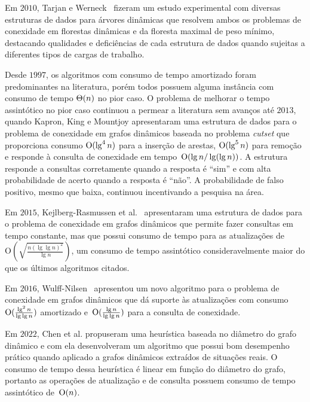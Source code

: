 Em $2010$, Tarjan e Werneck~\cite{tarjanWerneck2010} fizeram um estudo experimental com diversas estruturas de dados para árvores dinâmicas que resolvem ambos os problemas de conexidade em florestas dinâmicas e da floresta maximal de peso mínimo,
destacando qualidades e deficiências de cada estrutura de dados quando sujeitas a diferentes tipos de cargas de trabalho. 

Desde $1997$, os algoritmos com consumo de tempo amortizado foram predominantes na literatura, porém todos possuem alguma instância com consumo de tempo $\Theta(n)$ no pior caso.
O problema de melhorar o tempo assintótico no pior caso continuou a permear a literatura sem avanços até $2013$, quando Kapron, King e Mountjoy \cite{bruceM} apresentaram uma estrutura de dados para o problema de conexidade em grafos dinâmicos baseada no problema \textit{cutset} que proporciona consumo $\mathrm{O}(\lg^4 n)$ para a inserção de arestas, $\mathrm{O}(\lg^5 n)$ para remoção e responde à consulta de conexidade em tempo~$\mathrm{O}(\lg n / \lg(\lg n))$.
A estrutura responde a consultas corretamente quando a resposta é “sim” e com alta probabilidade de acerto quando a resposta é “não”. A probabilidade de falso positivo, mesmo que baixa, continuou incentivando a pesquisa na área. 

Em $2015$, Kejlberg-Rasmussen et al.~\cite{kejlbergrasmussen_et_al} apresentaram uma estrutura de dados para o problema de conexidade em grafos dinâmicos que permite fazer consultas em tempo constante, mas que possui consumo de tempo para as atualizações de~$\mathrm{O}\!\left(\sqrt{\frac{n\left(\lg \lg n\right)^2}{\lg n}}\right)$, um consumo de tempo assintótico consideravelmente maior do que os últimos algoritmos citados.

Em $2016$, Wulff-Nilsen~\cite{Wulff-Nilsen2016} apresentou um novo algoritmo para o problema de conexidade em grafos dinâmicos que dá suporte às atualizações com consumo~$\mathrm{O}(\frac{\lg^2 n}{\lg \lg n})$ amortizado e~$\mathrm{O}(\frac{\lg n}{\lg \lg n})$ para a consulta de conexidade.

Em $2022$, Chen et al. \cite{QC22} propuseram uma heurística baseada no diâmetro do grafo dinâmico e com ela desenvolveram um algoritmo que possui bom desempenho prático quando aplicado a grafos dinâmicos extraídos de situações reais.
O consumo de tempo dessa heurística é linear em função do diâmetro do grafo, portanto as operações de atualização e de consulta possuem consumo de tempo assintótico de~$\mathrm{O}(n)$.

